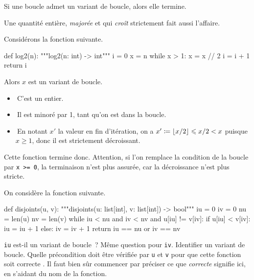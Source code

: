 \documentclass{magnolia}
\begin{document}
\begin{proposition}
  Si une boucle admet un variant de boucle, alors elle termine.
\end{proposition}

\begin{remarqueUnique}
  \remarque
  Une quantité entière, \emph{majorée} et qui \emph{croît} strictement
  fait aussi l'affaire.
\end{remarqueUnique}

\begin{exempleUnique}
  \exemple
  Considérons la fonction suivante.

\begin{pythoncodeline}
def log2(n):
    """log2(n: int) -> int"""
    i = 0
    x = n
    while x > 1:
        x = x // 2
        i = i + 1
    return i
\end{pythoncodeline}
  Alors $x$ est un variant de boucle.
  \begin{itemize}
    \item $\ $C'est un entier.
    \item $\ $Il est minoré par 1, tant qu'on est dans la boucle.
    \item $\ $En notant $x'$ la valeur en fin d'itération, on
          a $x' \coloneqq \lfloor x/2 \rfloor \leqslant x/2 < x$ puisque
          $x \geq 1$, donc il est strictement décroissant.
  \end{itemize}
  Cette fonction termine donc.
    Attention, si l'on remplace la condition de la boucle par
    \verb|x >= 0|, la terminaison n'est plus assurée, car la
    décroissance n'est plus stricte.
\end{exempleUnique}
\vspace{2ex}
\begin{exoUnique}
  \exo
  On considère la fonction suivante.
\begin{pythoncodeline}
def disjoints(u, v):
    """disjoints(u: list[int], v: list[int]) -> bool"""
    iu = 0
    iv = 0
    nu = len(u)
    nv = len(v)
    while iu < nu and iv < nv and u[iu] != v[iv]:
        if u[iu] < v[iv]:
            iu = iu + 1
        else:
            iv = iv + 1
    return iu == nu or iv == nv
\end{pythoncodeline}
  \begin{questions}
    \question \verb!iu! est-il un variant de boucle~? Même question pour
          \verb!iv!.
    \question Identifier un variant de boucle.
    \question Quelle précondition doit être vérifiée par \verb!u! et
    \verb!v! pour que cette fonction soit \og correcte \fg. Il faut bien sûr
    commencer par préciser ce que \emph{correcte} signifie ici, en
    s'aidant du nom de la fonction.
  \end{questions}
\end{exoUnique}
\end{document}
